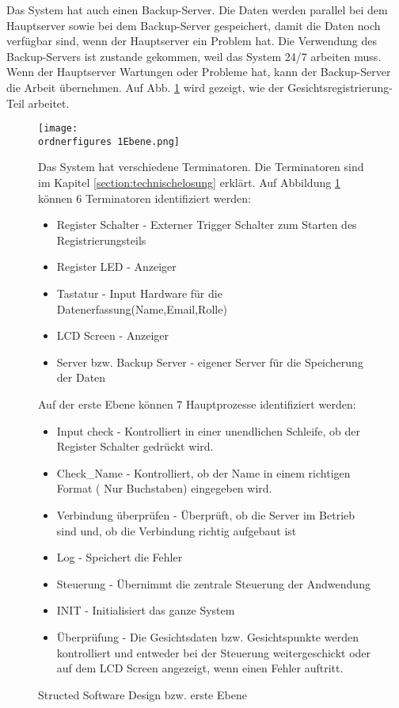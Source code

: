 Das System hat auch einen Backup-Server. Die Daten werden parallel bei dem Hauptserver sowie bei dem Backup-Server gespeichert, damit die Daten noch verf\"ugbar sind, wenn der Hauptserver ein Problem hat. Die Verwendung des Backup-Servers ist zustande gekommen, weil das System 24/7 arbeiten muss. Wenn der Hauptserver Wartungen oder Probleme hat, kann der Backup-Server die Arbeit \"ubernehmen. Auf Abb. \ref{fig:1Ebene_Gesichtsregistrierung} wird gezeigt, wie der Gesichtsregistrierung-Teil arbeitet.

\begin{figure}[H]
	\texttt{[image: \\ordnerfigures 1Ebene.png]}
	\caption{Structed Software Design bzw. erste Ebene } 
	
	Das System hat verschiedene Terminatoren. Die Terminatoren sind im Kapitel  \ref{section:technischelosung} erkl\"art. 
	Auf Abbildung \ref{fig:1Ebene_Gesichtsregistrierung} k\"onnen 6 Terminatoren identifiziert werden:
	\begin{itemize}
	\item Register Schalter - Externer Trigger Schalter zum Starten des Registrierungsteils 
	\item Register LED - Anzeiger 
	\item Tastatur - Input Hardware f\"ur die Datenerfassung(Name,Email,Rolle) 
	\item LCD Screen - Anzeiger 
	\item Server bzw. Backup Server - eigener Server f\"ur die Speicherung der Daten 
	\end{itemize}
	\newpage
	Auf der erste Ebene k\"onnen 7 Hauptprozesse identifiziert werden:
	\begin{itemize}
	\item Input check - Kontrolliert in einer unendlichen Schleife, ob der Register Schalter gedr\"uckt wird.
	\item Check\_Name - Kontrolliert, ob der Name in einem richtigen Format ( Nur Buchstaben) eingegeben wird. 
	\item Verbindung \"uberpr\"ufen - \"Uberpr\"uft, ob die Server im Betrieb sind und, ob die Verbindung richtig aufgebaut ist
	\item Log - Speichert die Fehler
	\item Steuerung - \"Ubernimmt die zentrale Steuerung der Andwendung
	\item INIT - Initialisiert das ganze System
	\item \"Uberpr\"ufung - Die Gesichtsdaten bzw. Gesichtspunkte werden kontrolliert und entweder bei der Steuerung weitergeschickt oder auf dem LCD Screen angezeigt, wenn einen Fehler auftritt.
	\end{itemize}
	\label{fig:1Ebene_Gesichtsregistrierung}
\end{figure}
